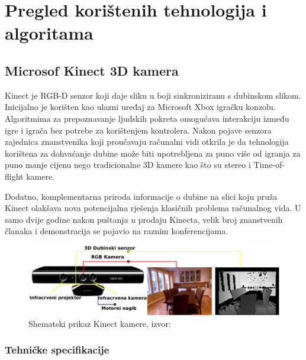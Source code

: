 \newpage
\setcounter{figure}{0}

\section{Pregled korištenih tehnologija i algoritama} %
\label{sec:Tehnologija i teorija}

\subsection{Microsof Kinect 3D kamera} %
\label{sub:Microsof Kinect 3D kamera}

Kinect je RGB-D senzor koji daje sliku u boji sinkroniziranu s dubinskom
slikom. Inicijalno je korišten kao ulazni uređaj za Microsoft Xbox
igračku konzolu. Algoritmima za prepoznavanje ljudskih pokreta omogućava
interakciju između igre i igrača bez potrebe za korištenjem kontrolera.
Nakon pojave senzora zajednica znanstvenika koji proučavaju računalni
vidi otkrila je da tehnologija korištena za dohvaćanje dubine može biti
upotrebljena za puno više od igranja za puno manje cijenu nego
tradicionalne 3D kamere kao što su stereo i Time-of-flight kamere.

Dodatno, komplementarna priroda informacije o dubine na slici koju pruža
Kinect olakšava nova potencijalna rješenja klasičnih problema računalnog
vida. U samo dvije godine nakon puštanja u prodaju Kinecta, velik broj
znanstvenih članaka i demonstracija se pojavio na raznim konferencijama.

\begin{figure}[h]
\centering
\includegraphics[scale=0.15]{figures/kinect.png}
\caption{Shematski prikaz Kinect kamere, izvor:~\cite{HanSXS13}}
\label{fig:kinect.png}
\end{figure}

\subsubsection{Tehničke specifikacije} %
\label{ssub:Tehničke specifikacije}

